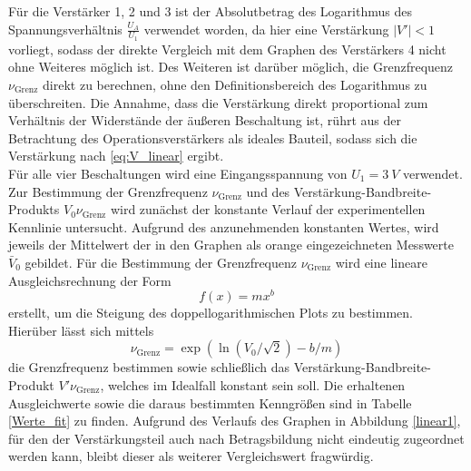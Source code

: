 Für die Verstärker 1, 2 und 3 ist der Absolutbetrag des Logarithmus des Spannungsverhältnis $\frac{U_A}{U_1}$ verwendet worden, da hier eine Verstärkung $|V'|<1$ vorliegt, sodass der direkte Vergleich mit dem Graphen des Verstärkers 4 nicht ohne Weiteres möglich ist. Des Weiteren ist darüber möglich, die Grenzfrequenz $\nu_\text{Grenz}$ direkt zu berechnen, ohne den Definitionsbereich des Logarithmus zu überschreiten.
Die Annahme, dass die Verstärkung direkt proportional zum Verhältnis der Widerstände der äußeren Beschaltung ist, rührt aus der Betrachtung des Operationsverstärkers als ideales Bauteil, sodass sich die Verstärkung nach \eqref{eq:V_linear} ergibt.\\
Für alle vier Beschaltungen wird eine Eingangsspannung von $U_1=\SI{3}{V}$ verwendet.
Zur Bestimmung der Grenzfrequenz $\nu_\text{Grenz}$ und des Verstärkung-Bandbreite-Produkts $V_0\nu_\text{Grenz}$ wird zunächst der konstante Verlauf der experimentellen Kennlinie untersucht. Aufgrund des anzunehmenden konstanten Wertes, wird jeweils der Mittelwert der in den Graphen als orange eingezeichneten Messwerte $\bar{V}_0$ gebildet.
Für die Bestimmung der Grenzfrequenz $\nu_\text{Grenz}$ wird eine lineare Ausgleichsrechnung der Form
\begin{equation}
  f(x)=mx^b
\end{equation}
erstellt, um die Steigung des doppellogarithmischen Plots zu bestimmen.
Hierüber lässt sich mittels
\begin{equation}
  \nu_\text{Grenz}=\exp(\ln(V_0/\sqrt{2})-b/m)
\end{equation}
die Grenzfrequenz bestimmen sowie schließlich das Verstärkung-Bandbreite-Produkt $V'\nu_\text{Grenz}$, welches im Idealfall konstant sein soll. Die erhaltenen Ausgleichwerte sowie die daraus bestimmten Kenngrößen sind in Tabelle \ref{Werte_fit} zu finden. Aufgrund des Verlaufs des Graphen in Abbildung \ref{linear1}, für den der Verstärkungsteil auch nach Betragsbildung nicht eindeutig zugeordnet werden kann, bleibt dieser als weiterer Vergleichswert fragwürdig.

